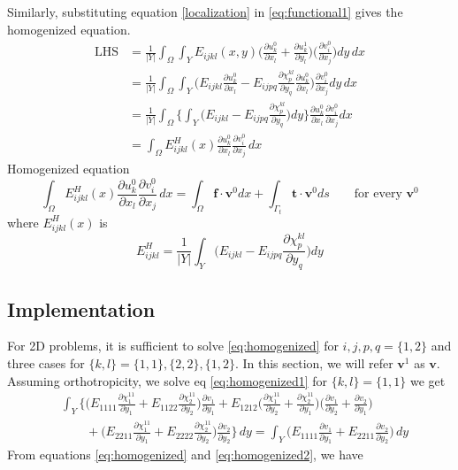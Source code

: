 \documentclass[openright,twoside]{iitkthesis}
\newcommand{\e}[1]{\textbf{#1}}
\begin{document}
Similarly, substituting equation \eqref{localization} in \eqref{eq:functional1} gives the homogenized equation.
\begin{align*}
\text{LHS}&=\frac{1}{|Y|}\int_\Omega\int_Y E_{ijkl}(x,y)\bigg (\frac{\partial u_{k}^0}{\partial x_l}+\frac{\partial u_{k}^1}{\partial y_l}\bigg )\bigg (\frac{\partial v_{i}^0}{\partial x_j}\bigg ) dy\,dx\\
&=\frac{1}{|Y|}\int_\Omega\int_Y \bigg (E_{ijkl}\frac{\partial u_{k}^0}{\partial x_l}-E_{ijpq}\frac{\partial \chi^{kl}_p}{\partial y_q}\frac{\partial u_{k}^0}{\partial x_l}\bigg )\frac{\partial v_{i}^0}{\partial x_j} dy\,dx\\
&=\frac{1}{|Y|}\int_\Omega\Bigg \{\int_Y \bigg (E_{ijkl}-E_{ijpq}\frac{\partial \chi^{kl}_p}{\partial y_q}\bigg )dy\Bigg \}\frac{\partial u_{k}^0}{\partial x_l}\frac{\partial v_{i}^0}{\partial x_j}dx\\
&=\int_\Omega E^H_{ijkl}(x)\frac{\partial u_{k}^0}{\partial x_l}\frac{\partial v_{i}^0}{\partial x_j}\,dx
\end{align*}
Homogenized equation
\begin{equation}
\int_\Omega E^H_{ijkl}(x)\frac{\partial u_{k}^0}{\partial x_l}\frac{\partial v_{i}^0}{\partial x_j}\,dx = \int_\Omega\textbf{f}\cdot\textbf{v}^0 dx + \int_{\Gamma_t}\textbf{t}\cdot\textbf{v}^0 ds \qquad \text{for every } \textbf{v}^0
\end{equation}
where $E^H_{ijkl}(x)$ is
\begin{equation}
\label{eq:homogenized}
\boxed{E^H_{ijkl} = \frac{1}{|Y|}\int_Y \bigg (E_{ijkl}-E_{ijpq}\frac{\partial \chi^{kl}_p}{\partial y_q}\bigg ) dy}
\end{equation}
\subsection{Implementation}
For 2D problems, it is sufficient to solve \eqref{eq:homogenized} for $i, j, p, q = \{1, 2\}$ and three cases for $\{k, l\} = \{1,1\}, \{2,2\}, \{1,2\}$. In this section, we will refer $\e v^1$ as $\e v$. Assuming orthotropicity, we solve eq \eqref{eq:homogenized1} for $\{k,l\} = \{1,1\}$ we get
\begin{equation}
\label{eq:homogenized2}
\begin{split}
&\int_Y \bigg \{\bigg ( E_{1111}\frac{\partial \chi^{11}_1}{\partial y_1} + E_{1122}\frac{\partial \chi^{11}_2}{\partial y_2}\bigg )\frac{\partial v_1}{\partial y_1} + E_{1212}\bigg (\frac{\partial \chi^{11}_1}{\partial y_2} + \frac{\partial \chi^{11}_2}{\partial y_1}\bigg )\bigg (\frac{\partial v_1}{\partial y_2} +\frac{\partial v_2}{\partial y_1}\bigg )\\
&\qquad + \bigg (E_{2211}\frac{\partial \chi^{11}_1}{\partial y_1} + E_{2222}\frac{\partial \chi^{11}_2}{\partial y_2}\bigg )\frac{\partial v_2}{\partial y_2}\bigg \}\,dy = \int_Y\bigg (E_{1111}\frac{\partial v_1}{\partial y_1}+E_{2211}\frac{\partial v_2}{\partial y_2}\bigg )\, dy
\end{split}
\end{equation}
From equations \eqref{eq:homogenized} and \eqref{eq:homogenized2}, we have
\end{document}
